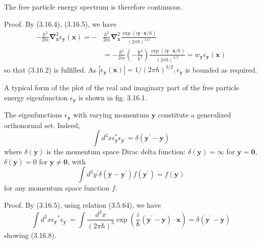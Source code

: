 \documentclass{article}
\begin{document}
The free particle energy spectrum is therefore continuous.

Proof. By (3.16.4), (3.16.5), we have
$$
\begin{align*}
-\frac{\hbar^{2}}{2 m} \boldsymbol{\nabla}_{\boldsymbol{x}}^{2} \epsilon_{\boldsymbol{y}}(\boldsymbol{x})=- & \frac{\hbar^{2}}{2 m} \boldsymbol{\nabla}_{\boldsymbol{x}}^{2} \frac{\exp (i \boldsymbol{y} \cdot \boldsymbol{x} / \hbar)}{(2 \pi \hbar)^{3 / 2}}  \tag{3.16.6}\\
& =-\frac{\hbar^{2}}{2 m}\left(-\frac{\boldsymbol{y}^{2}}{\hbar^{2}}\right) \frac{\exp (i \boldsymbol{y} \cdot \boldsymbol{x} / \hbar)}{(2 \pi \hbar)^{3 / 2}}=w_{\boldsymbol{y}} \epsilon_{\boldsymbol{y}}(\boldsymbol{x})
\end{align*}
$$
so that (3.16.2) is fulfilled. As $\left|\epsilon_{\boldsymbol{y}}(\boldsymbol{x})\right|=1 /(2 \pi \hbar)^{3 / 2}, \epsilon_{\boldsymbol{y}}$ is bounded as required.

A typical form of the plot of the real and imaginary part of the free particle energy eigenfunction $\epsilon_{\boldsymbol{y}}$ is shown in fig. 3.16.1.

The eigenfunctions $\epsilon_{\boldsymbol{y}}$ with varying momentum $\boldsymbol{y}$ constitute a generalized orthonormal set. Indeed,
$$
\begin{equation*}
\int d^{3} x \epsilon_{\boldsymbol{y}}^{*} \epsilon_{\boldsymbol{y}^{\prime}}=\delta\left(\boldsymbol{y}^{\prime}-\boldsymbol{y}\right) \tag{3.16.7}
\end{equation*}
$$
where $\delta(\boldsymbol{y})$ is the momentum space Dirac delta function: $\delta(\boldsymbol{y})=\infty$ for $\boldsymbol{y}=\mathbf{0}$, $\delta(\boldsymbol{y})=0$ for $\boldsymbol{y} \neq \mathbf{0}$, with
$$
\begin{equation*}
\int d^{3} y^{\prime} \delta\left(\boldsymbol{y}-\boldsymbol{y}^{\prime}\right) f\left(\boldsymbol{y}^{\prime}\right)=f(\boldsymbol{y}) \tag{3.16.8}
\end{equation*}
$$
for any momentum space function $f$.

Proof. By (3.16.5), using relation (3.5.64), we have
$$
\begin{equation*}
\int d^{3} x \epsilon_{\boldsymbol{y}}{ }^{*} \epsilon_{\boldsymbol{y}^{\prime}}=\int \frac{d^{3} x}{(2 \pi \hbar)^{3}} \exp \left(\frac{i}{\hbar}\left(\boldsymbol{y}^{\prime}-\boldsymbol{y}\right) \cdot \boldsymbol{x}\right)=\delta\left(\boldsymbol{y}^{\prime}-\boldsymbol{y}\right) \tag{3.16.9}
\end{equation*}
$$
showing (3.16.8).
\end{document}
